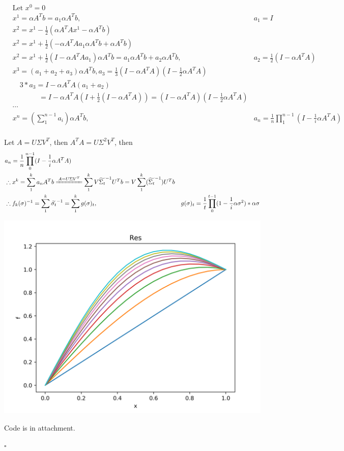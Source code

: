 \documentclass[a4paper]{article}
\begin{document}
\begin{align*}
    & \text{Let } x^0 = 0 \\
    & x^1 = \alpha A^T b = a_1 \alpha A^T b ,\ &a_1 = I \\
    & x^2 = x^1 - \frac{1}{2} (\alpha A^T A x^1 - \alpha A^T b ) \\ 
    & x^2 = x^1 + \frac{1}{2} ( - \alpha A^T A a_1 \alpha A^T b + \alpha A^T b ) \\
    & x^2 = x^1 + \frac{1}{2} (I - \alpha A^T A a_1 ) \alpha A^T b
            = a_1 \alpha A^T b  + a_2 \alpha A^T b,\ &a_2 = \frac{1}{2} (I - \alpha A^T A) \\
    & x^3 = (a_1 + a_2 + a_3) \alpha A^T b, a_3 = \frac{1}{3} (I - \alpha A^T A) (I - \frac{1}{2} \alpha A^T A)\\
    & \quad 3*a_3 = I - \alpha A^T A (a_1 + a_2) \\
    & \qquad \quad \text{  } = I - \alpha A^T A (I + \frac{1}{2} (I - \alpha A^T A))
                    = (I - \alpha A^T A) (I - \frac{1}{2} \alpha A^T A) \\
    & \cdots \\
    & x^n = (\sum_1^{n-1} a_i) \alpha A^T b,\ 
        &a_n = \frac{1}{n} \prod_1^{n-1} (I - \frac{1}{i}\alpha A^T A) \\
\end{align*}

Let $ A = U \Sigma V^T $, then $A^T A = U \Sigma^2 V^T$, then
\begin{align*}
& a_n = \frac{1}{n} \prod_0^{n-1} (I - \frac{1}{i}\alpha A^T A) \\
& \therefore x^k = \sum_1^k a_n A^T b
                \xlongequal[]{A = U\Sigma V^T}\sum_1^k V \widetilde{\Sigma_t}^{-1} U^T b 
                = V \sum_1^k (\widetilde{\Sigma_t}^{-1}) U^T b 
                \\
& \therefore f_k(\sigma)^{-1} = \sum_1^k \widetilde{\sigma_t}^{-1} = \sum_1^k g(\sigma)_t,\ &
g(\sigma)_t = \frac{1}{t} \prod_0^{t-1} (1 - \frac{1}{i}\alpha \sigma^2) * \alpha \sigma \\
\end{align*}

\includegraphics[scale=0.6]{hw3.png}

Code is in attachment. 

$\square$
\end{document}
